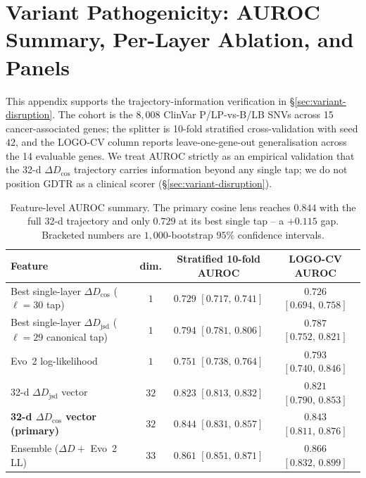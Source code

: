 \documentclass{article}
\theoremstyle{plain}
\theoremstyle{definition}
\theoremstyle{remark}
\newcommand{\gDTR}{\textsc{GDTR}}
\newcommand{\DDcos}{\Delta D_{\cos}}
\newcommand{\DDjsd}{\Delta D_{\mathrm{jsd}}}
\begin{document}
\FloatBarrier
\section{Variant Pathogenicity: AUROC Summary, Per-Layer Ablation, and Panels}
\label{app:auroc-detail}

This appendix supports the trajectory-information verification in \S\ref{sec:variant-disruption}. The cohort is the $8{,}008$ ClinVar P/LP-vs-B/LB SNVs across 15 cancer-associated genes; the splitter is 10-fold stratified cross-validation with seed $42$, and the LOGO-CV column reports leave-one-gene-out generalisation across the 14 evaluable genes. We treat AUROC strictly as an empirical validation that the 32-d $\DDcos$ trajectory carries information beyond any single tap; we do not position \gDTR{} as a clinical scorer (\S\ref{sec:variant-disruption}).

\begin{table}[!htbp]
  \caption{Feature-level AUROC summary. The primary cosine lens reaches
    $0.844$ with the full 32-d trajectory and only $0.729$ at its best single
    tap -- a $+0.115$ gap. Bracketed numbers are $1{,}000$-bootstrap $95\%$
  confidence intervals.}
  \label{tab:auroc}
  \centering
  \small
  \begin{tabular}{@{}lccc@{}}
    \toprule
    Feature & dim. & Stratified 10-fold AUROC & LOGO-CV AUROC \\
    \midrule
    Best single-layer $\DDcos$ ($\ell=30$ tap) & $1$
    & $0.729$ $[0.717,\, 0.741]$
    & $0.726$ $[0.694,\, 0.758]$ \\
    Best single-layer $\DDjsd$ ($\ell=29$ canonical tap) & $1$
    & $0.794$ $[0.781,\, 0.806]$
    & $0.787$ $[0.752,\, 0.821]$ \\
    Evo~2 log-likelihood & $1$
    & $0.751$ $[0.738,\, 0.764]$
    & $0.793$ $[0.740,\, 0.846]$ \\
    32-d $\DDjsd$ vector & $32$
    & $0.823$ $[0.813,\, 0.832]$
    & $0.821$ $[0.790,\, 0.853]$ \\
    \textbf{32-d $\DDcos$ vector (primary)} & $32$
    & $\mathbf{0.844}$ $[0.831,\, 0.857]$
    & $\mathbf{0.843}$ $[0.811,\, 0.876]$ \\
    Ensemble ($\Delta D + $ Evo~2 LL) & $33$
    & $0.861$ $[0.851,\, 0.871]$
    & $0.866$ $[0.832,\, 0.899]$ \\
    \bottomrule
  \end{tabular}
\end{table}
\end{document}
